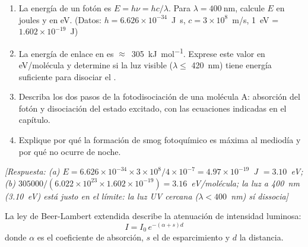 \begin{bloque_ejercicios}
\begin{ejercicios}
\begin{enumerate}[label=\alph*)]
    \item La energ\'ia de un fot\'on es $E = h\nu = hc/\lambda$.
          Para $\lambda = \SI{400}{\nano\metre}$, calcule $E$ en
          joules y en eV.
          (Datos: $h = 6.626\times10^{-34}$~J~s,
          $c = 3\times10^8$~m/s, 1~eV = $1.602\times10^{-19}$~J)
    \item La energ\'ia de enlace  en  es
          $\approx$~\SI{305}{\kilo\joule\per\mole}.
          Exprese este valor en eV/mol\'ecula y determine si la
          luz visible ($\lambda \leq$ \SI{420}{\nano\metre}) tiene
          energ\'ia suficiente para disociar el .
    \item Describa los dos pasos de la fotodisociaci\'on de
          una mol\'ecula A: absorci\'on del fot\'on y disociaci\'on
          del estado excitado, con las ecuaciones indicadas
          en el cap\'itulo.
    \item Explique por qu\'e la formaci\'on de smog fotoqu\'imico
          es m\'axima al mediod\'ia y por qu\'e no ocurre de noche.
\end{enumerate}

\textit{[Respuesta:
(a) $E = 6.626\times10^{-34}\times3\times10^8
    / 4\times10^{-7}
    = 4.97\times10^{-19}$~J $= 3.10$~eV;
(b) $305000/(6.022\times10^{23}\times1.602\times10^{-19})
    = 3.16$~eV/mol\'ecula;
    la luz a 400~nm (3.10~eV) est\'a justo en el l\'imite:
    la luz UV cercana ($\lambda < 400$~nm) s\'i dissocia]}

\item La ley de Beer-Lambert extendida describe la atenuaci\'on
de intensidad luminosa:
\[
    I = I_0\,e^{-(\alpha+s)d}
\]
donde $\alpha$ es el coeficiente de absorci\'on,
$s$ el de esparcimiento y $d$ la distancia.


\end{ejercicios}
\end{bloque_ejercicios}
